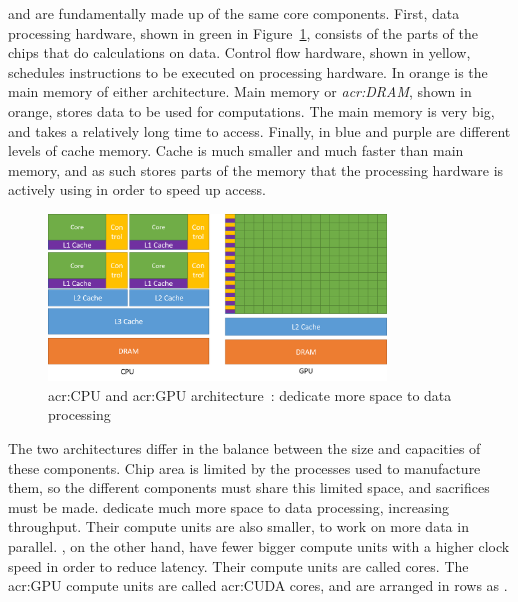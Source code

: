  and  are fundamentally made up of the same core components.
First, data processing hardware, shown in green in Figure~\ref{fig:cpu_gpu}, consists of the parts
of the chips that do calculations on data. Control flow hardware, shown in yellow, schedules
instructions to be executed on processing hardware. In orange is the main memory of either
architecture. Main memory or \textit{\acrfull{acr:DRAM}}, shown in orange, stores data to be used
for computations. The main memory is very big, and takes a relatively long time to access. Finally,
in blue and purple are different levels of cache memory. Cache is much smaller and much faster than
main memory, and as such stores parts of the memory that the processing hardware is actively using
in order to speed up access.

\begin{figure}[H]
	\centering
	\includegraphics[width=0.8\textwidth]{Chapter_graphics_processing_units/media/gpu-devotes-more-transistors-to-data-processing}
	\caption{\Acrshort{acr:CPU} and \acrshort{acr:GPU} architecture~\cite{Nvidia2021}:  dedicate more space to data processing}\label{fig:cpu_gpu}
\end{figure}

The two architectures differ in the balance between the size and capacities of these components.
Chip area is limited by the processes used to manufacture them, so the different components must
share this limited space, and sacrifices must be made.  dedicate much more space
to data processing, increasing throughput. Their compute units are also smaller, to work on more
data in parallel. , on the other hand, have fewer bigger compute units with a
higher clock speed in order to reduce latency. Their compute units are called cores. The
\acrshort{acr:GPU} compute units are called \acrshort{acr:CUDA} cores, and are arranged in rows as
\textit{}.

